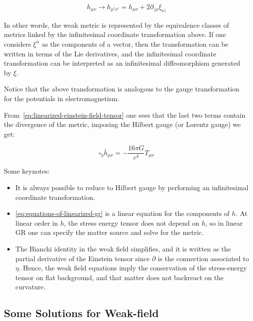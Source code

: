 \begin{equation}
    h_{\mu\nu}\rightarrow h_{\mu'\nu'} = h_{\mu\nu} + 2\partial_{(\mu}\xi_{\nu)}\label{eq:infinitesimal-transformation-of-perturbed-metric}
\end{equation}

In other words, the weak metric is represented by the equivalence classes of metrics linked by the infinitesimal coordinate transformation above.
If one considers $\xi^\alpha$ as the components of a vector, then the transformation can be written in terms of the Lie derivatives, and the infinitesimal coordinate transformation can be interpreted as an infinitesimal diffeomorphism generated by $\xi$.

Notice that the above transformation is analogous to the gauge transformation for the potentials in electromagnetism.

From~\ref{eq:linearized-einstein-field-tensor} one sees that the last two terms contain the divergence of the metric, imposing the Hilbert gauge (or Lorentz gauge) we get:

\begin{equation}
    \square_{\eta} \bar{h}_{\mu\nu} = -\frac{16 \pi G}{c^4}T_{\mu\nu}\label{eq:equations-of-linearized-gr}
\end{equation}

Some keynotes:
\begin{itemize}
    \item It is always possible to reduce to Hilbert gauge by performing an infinitesimal coordinate transformation.
    \item \ref{eq:equations-of-linearized-gr} is a linear equation for the components of $h$.
    At linear order in $h$, the stress energy tensor does not depend on $h$, so in linear GR one can specify the matter source and solve for the metric.
    \item The Bianchi identity in the weak field simplifies, and it is written as the partial derivative of the Einstein tensor since $\partial$ is the connection associated to $\eta$.
    Hence, the weak field equations imply the conservation of the stress-energy tensor on flat background, and that matter does not backreact on the curvature.
\end{itemize}


\subsection{Some Solutions for Weak-field}\label{subsec:some-solutions-for-weak-Field}

